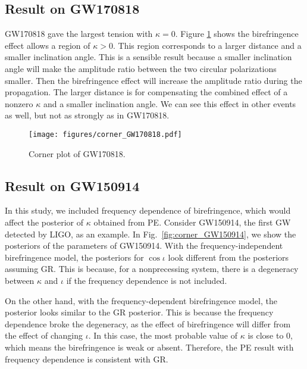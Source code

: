 \documentclass[aps,prd,twocolumn,superscriptaddress,preprintnumbers,floatfix,nofootinbib]{revtex4-2}
\begin{document}

\subsection{Result on GW170818}
GW170818 gave the largest tension with $\kappa=0$.
Figure \ref{fig:corner_GW170818} shows the birefringence effect allows a region of $\kappa>0$.
This region corresponds to a larger distance and a smaller inclination angle.
This is a sensible result because a smaller inclination angle will make the amplitude ratio between the two circular polarizations smaller.
Then the birefringence effect will increase the amplitude ratio during the propagation.
The larger distance is for compensating the combined effect of a nonzero $\kappa$ and a smaller inclination angle.
We can see this effect in other events as well, but not as strongly as in GW170818.

\begin{figure}
    \texttt{[image: figures/corner\_GW170818.pdf]}
    \caption{Corner plot of GW170818.}
    \label{fig:corner_GW170818}
\end{figure}

\subsection{Result on GW150914}
In this study, we included frequency dependence of birefringence, which would affect the posterior of $\kappa$ obtained from \ac{PE}.
Consider GW150914, the first GW detected by LIGO, as an example.
In Fig.~\ref{fig:corner_GW150914}, we show the posteriors of the parameters of GW150914.
With the frequency-independent birefringence model, the posteriors for $\cos\iota$ look different from the posteriors assuming GR.
This is because, for a nonprecessing system, there is a degeneracy between $\kappa$ and $\iota$ if the frequency dependence is not included.

On the other hand, with the frequency-dependent birefringence model, the posterior looks similar to the GR posterior.
This is because the frequency dependence broke the degeneracy, as the effect of birefringence will differ from the effect of changing $\iota$.
In this case, the most probable value of $\kappa$ is close to $0$, which means the birefringence is weak or absent.
Therefore, the \ac{PE} result with frequency dependence is consistent with GR.
\end{document}

